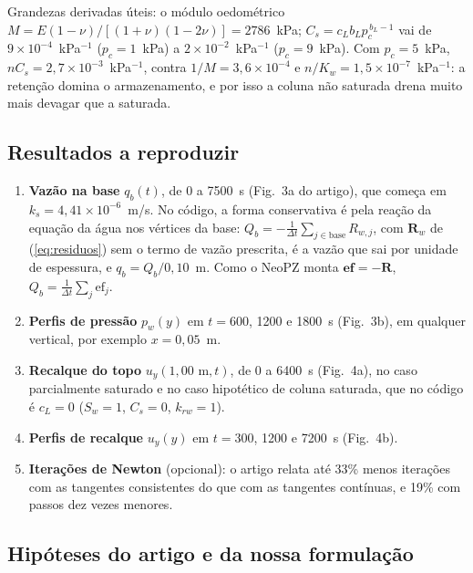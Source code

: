 \documentclass[11pt,a4paper]{article}
\begin{document}
Grandezas derivadas úteis: o módulo oedométrico $M=E(1-\nu)/[(1+\nu)(1-2\nu)]=2786$~kPa;
$C_s=c_Lb_Lp_c^{\,b_L-1}$ vai de $9\times10^{-4}$~kPa$^{-1}$ ($p_c=1$~kPa) a
$2\times10^{-2}$~kPa$^{-1}$ ($p_c=9$~kPa). Com $p_c=5$~kPa, $nC_s=2{,}7\times10^{-3}$~kPa$^{-1}$,
contra $1/M=3{,}6\times10^{-4}$ e $n/K_w=1{,}5\times10^{-7}$~kPa$^{-1}$: a retenção domina o
armazenamento, e por isso a coluna não saturada drena muito mais devagar que a saturada.

\subsection{Resultados a reproduzir}
\label{sec:liak_res}
\begin{enumerate}[label=(\alph*),leftmargin=*]
\item \textbf{Vazão na base} $q_b(t)$, de 0 a 7500~s (Fig.~3a do artigo), que começa em
  $k_s=4{,}41\times10^{-6}$~m/s. No código, a forma conservativa é pela reação da equação da
  água nos vértices da base: $Q_b=-\frac{1}{\Delta t}\sum_{j\in\text{base}}R_{w,j}$, com
  $\mathbf R_w$ de (\ref{eq:residuos}) sem o termo de vazão prescrita, é a vazão que sai por
  unidade de espessura, e $q_b=Q_b/0{,}10$~m. Como o NeoPZ monta $\mathbf{ef}=-\mathbf R$,
  $Q_b=\frac1{\Delta t}\sum_j\mathrm{ef}_j$.
\item \textbf{Perfis de pressão} $p_w(y)$ em $t=600$, 1200 e 1800~s (Fig.~3b), em qualquer
  vertical, por exemplo $x=0{,}05$~m.
\item \textbf{Recalque do topo} $u_y(1{,}00\text{ m},t)$, de 0 a 6400~s (Fig.~4a), no caso
  parcialmente saturado e no caso hipotético de coluna saturada, que no código é $c_L=0$
  ($S_w=1$, $C_s=0$, $k_{rw}=1$).
\item \textbf{Perfis de recalque} $u_y(y)$ em $t=300$, 1200 e 7200~s (Fig.~4b).
\item \textbf{Iterações de Newton} (opcional): o artigo relata até 33\% menos iterações com as
  tangentes consistentes do que com as tangentes contínuas, e 19\% com passos dez vezes menores.
\end{enumerate}

\subsection{Hipóteses do artigo e da nossa formulação}
\label{sec:liak_hip}
\end{document}
